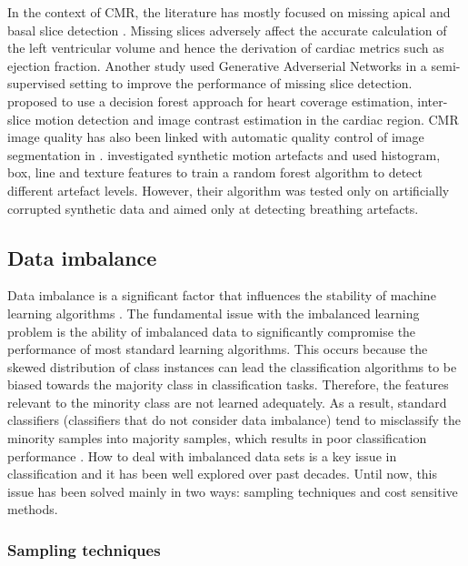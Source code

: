 \documentclass[preprint,12pt,authoryear]{elsarticle}
\begin{document}
 In the context of CMR, the literature has mostly focused on  missing apical and basal slice detection \citep{Zhang2016}. Missing slices adversely affect the accurate calculation of the left ventricular volume and hence the derivation of cardiac metrics such as ejection fraction. Another study \citep{Zhang2017} used Generative Adverserial Networks in a semi-supervised setting to improve the performance of missing slice detection.
 \cite{Tarroni2018} proposed to use a decision forest approach for heart coverage estimation, inter-slice motion detection and image contrast estimation in the cardiac region.
 CMR image quality has also been linked with automatic quality control of image segmentation in \cite{Robinson2017}.
 \cite{Lorch2017} investigated synthetic motion artefacts and used histogram, box, line and texture features to train a random forest algorithm to detect different artefact levels. However, their algorithm was tested only on artificially corrupted synthetic data and aimed only at detecting breathing artefacts.


\subsection{Data imbalance}
\label{sec:dataimbalance}

Data imbalance is a significant factor that influences the stability of machine learning algorithms \citep{Chawla2010}. The fundamental issue with the imbalanced learning problem is the ability of imbalanced data to significantly compromise the performance of most standard learning algorithms.
This occurs because the skewed distribution of class instances can lead the classification algorithms to be biased towards the majority class in classification tasks. Therefore, the features relevant to the minority class are not learned adequately. As a result, standard classifiers (classifiers that do not consider data imbalance) tend to misclassify the minority samples into majority samples, which results in poor classification performance \citep{Wang2016}.  How to deal with imbalanced data sets is a key issue in classification and it has been well explored over past decades. Until now, this issue has been solved mainly in two ways: sampling techniques and cost sensitive methods.

\subsubsection{Sampling techniques}
\end{document}
